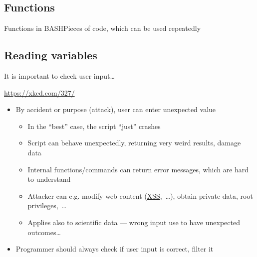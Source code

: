 \documentclass[compress, xelatex, 11pt, xcolor=svgnames, aspectratio=169,
	hyperref={
		bookmarks=true,
		unicode=true,
		colorlinks=true,
		pdftitle={Linux, command line and MetaCentrum},
		plainpages=false,
		pdfauthor={Vojtech Zeisek},
		pdfsubject={Course about use of Linux command line, writing shell scripts and using MetaCentrum of CESNET},
		pdfcreator={XeLaTeX},
		pdfkeywords={Linux, GNU, BASH, shell, command line, MetaCentrum},
		linkcolor=DarkRed, %
		anchorcolor=DarkBlue, %
		citecolor=Indigo, %
		filecolor=NavyBlue, %
		menucolor=DarkMagenta, %
		urlcolor=DarkBlue, %
		},
	url={hyphens, lowtilde} %
	]{beamer}
\renewcommand{\texttt}[1]{\colorbox{Beige}{{\ttfamily #1}}}
\begin{document}
\subsection{Functions}

\begin{frame}[fragile]{Functions in BASH}{Pieces of code, which can be used repeatedly}
\end{frame}

\subsection{Reading variables}

\begin{frame}{It is important to check user input\ldots}
	\begin{center}
		\texttt{[image: exploits\_of\_a\_mom.png]}
	\end{center}
	\begin{flushright}
		\url{https://xkcd.com/327/}
	\end{flushright}
	\begin{itemize}
		\item By accident or purpose (attack), user can enter unexpected value
		\begin{itemize}
			\item In the \enquote{best} case, the script \enquote{just} crashes
			\item Script can behave unexpectedly, returning very weird results, damage data
			\item Internal functions/commands can return error messages, which are hard to understand
			\item Attacker can e.g. modify web content (\href{https://en.wikipedia.org/wiki/Cross-site_scripting}{XSS},~\ldots), obtain private data, root privileges,~\ldots
			\item Applies also to scientific data --- wrong input use to have unexpected outcomes\ldots
		\end{itemize}
		\item Programmer should always check if user input is correct, filter it
	\end{itemize}
\end{frame}
\end{document}
